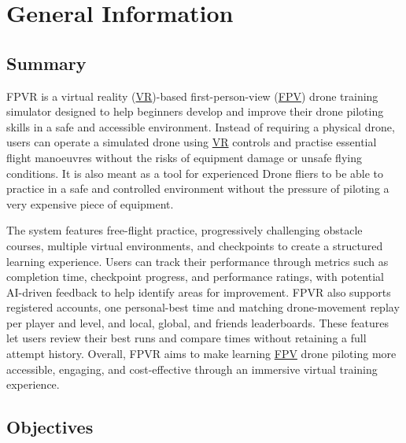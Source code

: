 \documentclass[12pt, titlepage]{article}
\begin{document}
\newpage


\section{General Information}

\subsection{Summary}

FPVR is a virtual reality (\hyperlink{abbr:VR}{VR})-based first-person-view (\hyperlink{abbr:FPV}{FPV}) drone training simulator designed to help beginners develop and improve their drone piloting skills in a safe and accessible environment. Instead of requiring a physical drone, users can operate a simulated drone using \hyperlink{abbr:VR}{VR} controls and practise essential flight manoeuvres without the risks of equipment damage or unsafe flying conditions. It is also meant as a tool for experienced Drone fliers to be able to practice in a safe and controlled environment without the pressure of piloting a very expensive piece of equipment.

The system features free-flight practice, progressively challenging obstacle courses, multiple virtual environments, and checkpoints to create a structured learning experience. Users can track their performance through metrics such as completion time, checkpoint progress, and performance ratings, with potential AI-driven feedback to help identify areas for improvement. FPVR also supports registered accounts, one personal-best time and matching drone-movement replay per player and level, and local, global, and friends leaderboards. These features let users review their best runs and compare times without retaining a full attempt history. Overall, FPVR aims to make learning \hyperlink{abbr:FPV}{FPV} drone piloting more accessible, engaging, and cost-effective through an immersive virtual training experience.

\subsection{Objectives}
\end{document}
